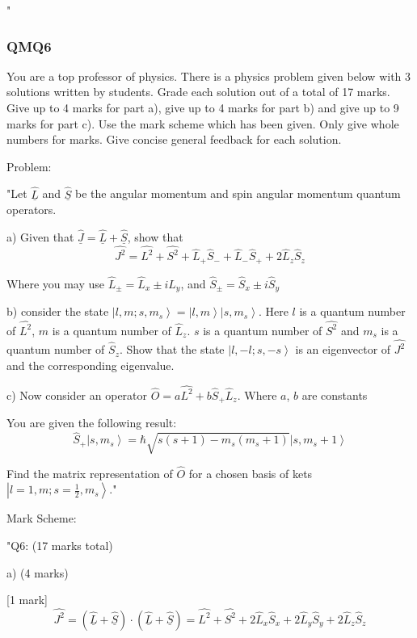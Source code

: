 "

\subsubsection{QMQ6}

You are a top professor of physics. There is a physics problem given below with 3 solutions written by students. Grade each solution out of a total of 17 marks. Give up to 4 marks for part a), give up to 4 marks for part b) and give up to 9 marks for part c). Use the mark scheme which has been given. Only give whole numbers for marks. Give concise general feedback for each solution. 

Problem:

"Let \( \hat{\underline{L}} \) and \( \hat{\underline{S}} \) be the angular momentum and spin angular momentum quantum operators. 

a) Given that \( \hat{\underline{J}} = \hat{\underline{L}} + \hat{\underline{S}} \), show that 
\[ \hat{J^{2}} =  \hat{L^{2}} + \hat{S^{2}} + \hat{L}_{+}\hat{S}_{-} +  \hat{L}_{-}\hat{S}_{+} + 2\hat{L}_{z}\hat{S}_{z} \]

Where you may use  \( \hat{L}_{\pm} = \hat{L}_{x} \pm i\hat{L}_{y} \), and \( \hat{S}_{\pm} = \hat{S}_{x} \pm i\hat{S}_{y} \)

b) consider the state \( \left|l, m; s, m_{s} \right> = \left|l, m \right>\left|s, m_{s} \right> \). Here \( l \) is a quantum number of \( \hat{L^{2}} \), \( m \) is a quantum number of \( \hat{L}_{z} \). \( s \) is a quantum number of \( \hat{S^{2}} \) and \( m_{s} \) is a quantum number of \( \hat{S}_{z} \). Show that the state \( \left|l, -l; s, -s \right> \) is an eigenvector of \( \hat{J^{2}} \) and the corresponding eigenvalue. 

c) Now consider an operator \( \hat{O} = a\hat{L^{2}} + b\hat{S}_{+}\hat{L}_{z} \). Where \( a \), \( b \) are constants

You are given the following result:
\[ \hat{S}_{+} \left|s, m_{s} \right> = \hbar \sqrt{s(s+1) - m_{s}(m_{s}+1)} \left|s, m_{s}+1 \right> \]

Find the matrix representation of \( \hat{O} \) for a chosen basis of kets \( \left|l=1, m; s=\frac{1}{2}, m_{s} \right> \)."

Mark Scheme:

"{Q6: (17 marks total) }

a) (4 marks)

[1 mark] \[ \hat{J^{2}} = \left(\hat{\underline{L}} + \hat{\underline{S}} \right) \cdot \left(\hat{\underline{L}} + \hat{\underline{S}} \right) =  \hat{L^{2}} + \hat{S^{2}} + 2\hat{L}_{x}\hat{S}_{x} + 2\hat{L}_{y}\hat{S}_{y} + 2\hat{L}_{z}\hat{S}_{z} \]

